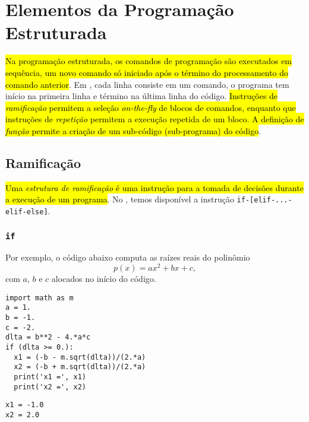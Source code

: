 
\section{Elementos da Programação Estruturada}\label{sec_progest}

\hl{Na programação estruturada, os comandos de programação são executados em sequência, um novo comando só iniciado após o término do processamento do comando anterior}. Em {\python}, cada linha consiste em um comando, o programa tem início na primeira linha e término na última linha do código. \hl{Instruções de \emph{ramificação} permitem a seleção \textit{on-the-fly} de blocos de comandos, enquanto que instruções de \emph{repetição} permitem a execução repetida de um bloco. A definição de \emph{função} permite a criação de um sub-código (sub-programa) do código}.

\subsection{Ramificação}

\hl{Uma \emph{estrutura de ramificação} é uma instrução para a tomada de decisões durante a execução de um programa}. No {\python}, temos disponível a instrução \texttt{if-[elif-...-elif-else]}.

\subsubsection{\texttt{if}}

Por exemplo, o código abaixo computa as raízes reais do polinômio
\begin{equation}
  p(x) = ax^2 + bx + c,
\end{equation}  
com $a$, $b$ e $c$ alocados no início do código.

\begin{lstlisting}
import math as m
a = 1.
b = -1.
c = -2.
dlta = b**2 - 4.*a*c
if (dlta >= 0.):
  x1 = (-b - m.sqrt(dlta))/(2.*a)
  x2 = (-b + m.sqrt(dlta))/(2.*a)
  print('x1 =', x1)
  print('x2 =', x2)
\end{lstlisting}

\begin{verbatim}
x1 = -1.0
x2 = 2.0
\end{verbatim}

